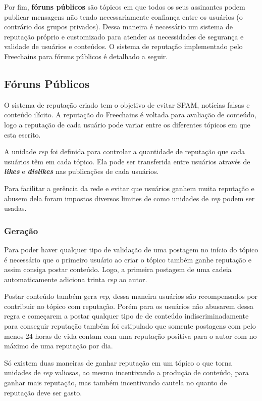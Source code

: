 \documentclass[12pt]{article}
\newcommand{\FC} {Freechains\xspace}
\begin{document}
Por fim, \textbf{fóruns públicos} são tópicos em que todos os seus assinantes podem publicar mensagens não tendo necessariamente confiança entre os usuários (o contrário dos grupos privados). Dessa maneira é necessário um sistema de reputação próprio e customizado para atender as necessidades de segurança e validade de usuários e conteúdos. O sistema de reputação implementado pelo \FC para fóruns públicos é detalhado a seguir.

\subsection{Fóruns Públicos} \label{subsec: forunspub}

O sistema de reputação criado tem o objetivo de evitar SPAM, notícias falsas e conteúdo ilícito. A reputação do \FC é voltada para avaliação de conteúdo, logo a reputação de cada usuário pode variar entre os diferentes tópicos em que esta escrito. 

A unidade \emph{rep} foi definida para controlar a quantidade de reputação que cada usuários têm em cada tópico. Ela pode ser transferida entre usuários através de \textbf{\emph{likes}} e \textbf{\emph{dislikes}} nas publicações de cada usuários.

Para facilitar a gerência da rede e evitar que usuários ganhem muita reputação e abusem dela foram impostos diversos limites de como unidades de \emph{rep} podem ser usadas. 

\subsubsection{Geração} \label{subsubsec:geracao}

Para poder haver qualquer tipo de validação de uma postagem no início do tópico é necessário que o primeiro usuário ao criar o tópico também ganhe reputação e assim consiga postar conteúdo. Logo, a primeira postagem de uma cadeia automaticamente adiciona trinta \emph{rep} ao autor. 

Postar conteúdo também gera \emph{rep}, dessa maneira usuários são recompensados por contribuir no tópico com reputação. Porém para os usuários não abusarem dessa regra e começarem a postar qualquer tipo de de conteúdo indiscriminadamente para conseguir reputação também foi estipulado que somente postagens com pelo menos 24 horas de vida contam com uma reputação positiva para o autor com no máximo de uma reputação por dia. 

Só existem duas maneiras de ganhar reputação em um tópico o que torna unidades de \emph{rep} valiosas, ao mesmo incentivando a produção de conteúdo, para ganhar mais reputação, mas também incentivando cautela no quanto de reputação deve ser gasto.  
\end{document}
